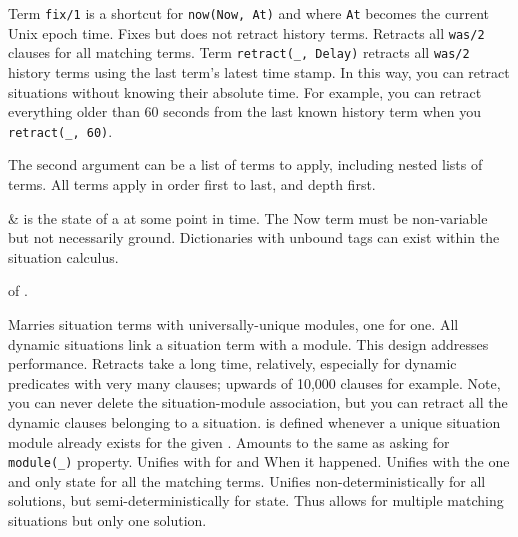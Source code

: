 \begin{description}
\begin{description}
Term \verb$fix/1$ is a shortcut for \verb$now(Now, At)$ and  where \verb$At$
becomes the current Unix epoch time. Fixes but does not retract
history terms.
Retracts all \verb$was/2$ clauses for all matching  terms.
Term \verb$retract(_, Delay)$ retracts all \verb$was/2$ history terms using
the last term's latest time stamp. In this way, you can retract
situations without knowing their absolute time. For example, you
can retract everything older than 60 seconds from the last known
history term when you \verb$retract(_, 60)$.
\end{description}

The second argument  can be a list of terms to apply, including
nested lists of terms. All terms apply in order first to last, and
depth first.

\begin{arguments}
 & is the state of a  at some point in time. The Now
term must be non-variable but not necessarily ground. Dictionaries
with unbound tags can exist within the situation calculus. \\
\end{arguments}

 of .

\begin{description}
Marries situation terms with universally-unique modules, one for
one. All dynamic situations link a situation term with a module.
This design addresses performance. Retracts take a long time,
relatively, especially for dynamic predicates with very many
clauses; upwards of 10,000 clauses for example. Note, you can
never delete the situation-module association, but you can
retract all the dynamic clauses belonging to a situation.
 is defined whenever a unique situation module already
exists for the given . Amounts to the same as asking
for \verb$module(_)$ property.
Unifies with  for  and When it happened. Unifies
with the one and only  state for all the matching
 terms. Unifies non-deterministically for all 
solutions, but semi-deterministically for  state. Thus
allows for multiple matching situations but only one 
solution.


\end{description}
\end{description}
